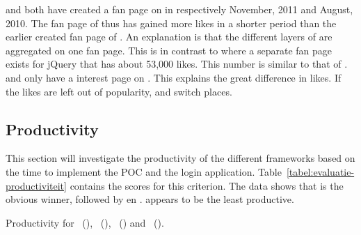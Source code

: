 \documentclass[a4paper]{artikel3}
\begin{document}
\kendob{} and \jqma{} both have created a fan page on \fb{} in respectively November, 2011 and August, 2010.
The fan page of \kendob{} thus has gained more \fb{} likes in a shorter period than the earlier created fan page of \jqma{}.
An explanation is that the different layers of \kendo{} are aggregated on one fan page.
This is in contrast to \jqma{} where a separate fan page exists for jQuery that has about 53,000 likes.
This number is similar to that of \kendo{}.
\sta{} and \lungo{} only have a interest page on \fb.
This explains the great difference in \fb{} likes.
If the likes are left out of popularity, \kendob{} and \jqma{} switch places.


\subsection{Productivity} %
\label{sec:evaluation-productivity}


This section will investigate the productivity of the different frameworks based on the time to implement the POC and the login application.
Table~\ref{tabel:evaluatie-productiviteit} contains the scores for this criterion.
The data shows that \lungo{} is the obvious winner,  followed by \kendo{} en \jqm{}.
\st{} appears to be the least productive.

\begin{table}[t]
\centering
{}
\caption{Productivity for \st{}~(\sta), \kendo{}~(\kendoa), \jqm{}~(\jqma) and \lungo{}~(\lungoa).}
\label{tabel:evaluatie-productiviteit}
\end{table}
\end{document}
